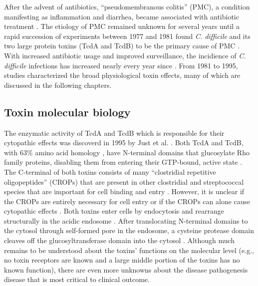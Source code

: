 After the advent of antibiotics, ``pseudomembranous colitis'' (PMC), a condition
manifesting as inflammation and diarrhea, became associated
with antibiotic treatment \cite{Tedesco:1974jo,Bartlett:2008jx}. 
The etiology of PMC remained unknown
for several years until a rapid succession of experiments between 1977 and 1981
found \textit{C. difficile} and its two large protein toxins (TcdA and TcdB)
 to be the primary cause of PMC 
\cite{Lusk:1978ub,Chang:1978um,Browne:1977ui,Fekety:1979ul,
Ebright:1981uj,Taylor:1981uda,Bartlett:1978tj,Bartlett:1977wra,
Lusk:1977wg,MRKeighley:1978ku}. 
With increased antibiotic usage and improved surveillance,
the incidience of \textit{C. difficile} infections has increased 
nearly every year since \cite{Lucado:2012wl}.
From 1981 to 1995, 
studies characterized the broad physiological toxin effects,
many of which are discussed in the following chapters.


\subsection{Toxin molecular biology}
The enzymatic activity of TcdA and TcdB which is responsible
for their cytopathic effects was discoverd 
in 1995 by Just et al. \cite{Just:1995ei,Just:1995kz}.
Both TcdA and TcdB, with 63\% amino acid
homology \cite{vonEichelStreiber:1992wu}, have N-terminal
domains that glucosylate Rho family proteins, disabling
them from entering their GTP-bound, active state \cite{Just:1995ei,Just:1995kz}.
The C-terminal of both toxins consists of many ``clostridial
repetitive oligopeptides'' (CROPs) that are present in 
other clostridial and streptococcal species 
\cite{vonEichelStreiber:1990ti,vonEichelStreiber:1992vb}
that are important for cell binding and 
entry \cite{Ho:2005vm,Greco:2006wf,Frisch:2003jo}.
However, it is unclear if the CROPs are entirely necessary
for cell entry or if the CROPs can alone cause
cytopathic effects \cite{Yeh:2008hd,Zemljic:2010ub}. Both toxins
enter cells by endocytosis and rearrange structurally
in the acidic endosome \cite{Papatheodorou:2010io,QaDan:2000fj}.
After translocating N-terminal domains to the cytosol through
self-formed pore in the endosome,
a cysteine protease domain cleaves off the glucosyltransferase
domain into the cytosol \cite{Egerer:2007fy,Genisyuerek:2011dr,Pfeifer:2003bx}.
Although much remains to be understood about the 
toxins' functions on the molecular level (e.g., no toxin receptors are known and
a large middle portion of the toxins has no known function), there
are even more unknowns about the disease pathogenesis disease that
is most critical to clinical outcome.

